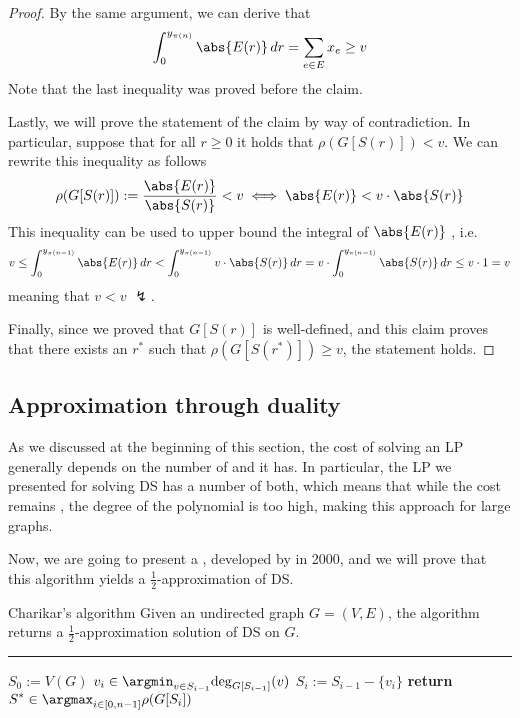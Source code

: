 \documentclass[a4paper, 12pt]{report}
\begin{document}
\begin{proof}
{            By the same argument, we can derive that $$\int_0^{y_{\pi(n)}}{\abs{E(r)} \, dr} = \sum_{e \in E}{x_e} \ge v$$ Note that the last inequality was proved before the claim.

            Lastly, we will prove the statement of the claim by way of contradiction. In particular, suppose that for all $r \ge 0$ it holds that $\rho(G[S(r)]) < v$. We can rewrite this inequality as follows $$\rho(G[S(r)]) := \dfrac{\abs{E(r)}}{\abs{S(r)}} < v \iff \abs{E(r)} < v \cdot \abs{S(r)}$$ This inequality can be used to upper bound the integral of $\abs{E(r)}$ , i.e. $$v \le \int_0^{y_{\pi(n - 1)}}{\abs{E(r)} \, dr} < \int_0^{y_{\pi(n - 1)}}{v \cdot \abs{S(r)} \, dr} = v \cdot \int_0^{y_{\pi(n - 1)}}{\abs{S(r)} \, dr} \le v \cdot 1 = v$$ meaning that $v < v$ $\lightning$.
        }

        Finally, since we proved that $G[S(r)]$ is well-defined, and this claim proves that there exists an $r^*$ such that $\rho(G[S(r^*)]) \ge v$, the statement holds.
    \end{proof}

    \subsection{Approximation through duality}

    As we discussed at the beginning of this section, the cost of solving an LP generally depends on the number of  and  it has. In particular, the LP we presented for solving DS has a  number of both, which means that while the cost remains , the degree of the polynomial is too high, making this approach  for large graphs.

    Now, we are going to present a , developed by \textcite{charikar} in 2000, and we will prove that this algorithm yields a $\tfrac{1}{2}$-approximation of DS.

    \begin{framedalgo}{Charikar's algorithm}
        Given an undirected graph $G = (V, E)$, the algorithm returns a $\tfrac{1}{2}$-approximation solution of DS on $G$. \\
        \hrule

        \quad
        \begin{algorithmic}[1]
                \State $S_0 := V(G)$
                    \State $\displaystyle v_i \in \argmin_{v \in S_{i - 1}}{\deg_{G[S_{i - 1}]}(v)}$
                    \State $S_i := S_{i - 1} - \{v_i\}$
                \EndFor
                \State \textbf{return} $\displaystyle S^* \in \argmax_{i \in [0, n - 1]}{\rho(G[S_i])}$
            \EndFunction
        \end{algorithmic}
    \end{framedalgo}
\end{document}
